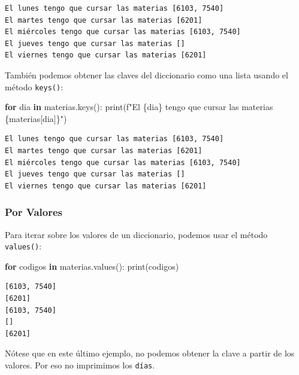 \documentclass[
  letterpaper,
  DIV=11,
  numbers=noendperiod]{scrreprt}
\newenvironment{Shaded}{\begin{snugshade}}{\end{snugshade}}
\newcommand{\BuiltInTok}[1]{\textcolor[rgb]{0.00,0.23,0.31}{#1}}
\newcommand{\ControlFlowTok}[1]{\textcolor[rgb]{0.00,0.23,0.31}{\textbf{#1}}}
\newcommand{\KeywordTok}[1]{\textcolor[rgb]{0.00,0.23,0.31}{\textbf{#1}}}
\newcommand{\NormalTok}[1]{\textcolor[rgb]{0.00,0.23,0.31}{#1}}
\newcommand{\SpecialCharTok}[1]{\textcolor[rgb]{0.37,0.37,0.37}{#1}}
\newcommand{\SpecialStringTok}[1]{\textcolor[rgb]{0.13,0.47,0.30}{#1}}
\begin{document}
\begin{verbatim}
El lunes tengo que cursar las materias [6103, 7540]
El martes tengo que cursar las materias [6201]
El miércoles tengo que cursar las materias [6103, 7540]
El jueves tengo que cursar las materias []
El viernes tengo que cursar las materias [6201]
\end{verbatim}

También podemos obtener las claves del diccionario como una lista usando
el método \texttt{keys()}:

\begin{Shaded}
\begin{Highlighting}[]
\ControlFlowTok{for}\NormalTok{ dia }\KeywordTok{in}\NormalTok{ materias.keys():}
    \BuiltInTok{print}\NormalTok{(}\SpecialStringTok{f"El }\SpecialCharTok{\{}\NormalTok{dia}\SpecialCharTok{\}}\SpecialStringTok{ tengo que cursar las materias }\SpecialCharTok{\{}\NormalTok{materias[dia]}\SpecialCharTok{\}}\SpecialStringTok{"}\NormalTok{)}
\end{Highlighting}
\end{Shaded}

\begin{verbatim}
El lunes tengo que cursar las materias [6103, 7540]
El martes tengo que cursar las materias [6201]
El miércoles tengo que cursar las materias [6103, 7540]
El jueves tengo que cursar las materias []
El viernes tengo que cursar las materias [6201]
\end{verbatim}

\subsubsection{Por Valores}\label{por-valores}

Para iterar sobre los valores de un diccionario, podemos usar el método
\texttt{values()}:

\begin{Shaded}
\begin{Highlighting}[]
\ControlFlowTok{for}\NormalTok{ codigos }\KeywordTok{in}\NormalTok{ materias.values():}
    \BuiltInTok{print}\NormalTok{(codigos)}
\end{Highlighting}
\end{Shaded}

\begin{verbatim}
[6103, 7540]
[6201]
[6103, 7540]
[]
[6201]
\end{verbatim}

Nótese que en este último ejemplo, no podemos obtener la clave a partir
de los valores. Por eso no imprimimos los \texttt{días}.
\end{document}

